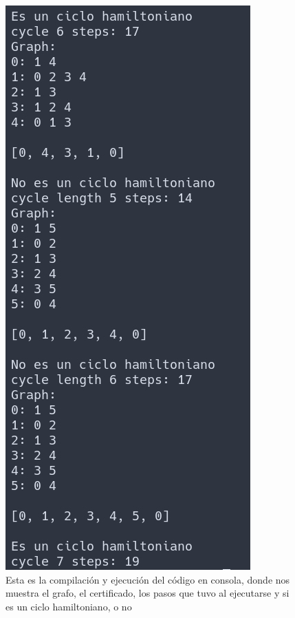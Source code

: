 \documentclass{article}
\begin{document}
    \begin{figure}[h!]
        \centering
        \includegraphics[width=0.3\textheight]{out_console_2.png}
        \caption{Esta es la compilación y ejecución del código en consola, donde nos muestra el grafo, el certificado, los pasos que tuvo al ejecutarse y si es un ciclo hamiltoniano, o no}
        \label{fig:my_label}
    \end{figure}
    \newpage
\end{document}
